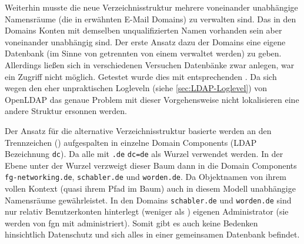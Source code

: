 \documentclass[11pt,a4paper,titlepage=firstiscover]{scrartcl} %
\begin{document}
Weiterhin musste die neue Verzeichnisstruktur   
mehrere voneinander unabhängige Namensräume (die  in 
 erwähnten E-Mail Domains) zu verwalten sind. Das 
  in den Domains Konten mit demselben 
unqualifizierten  Namen vorhanden 
sein  aber voneinander unabhängig sind. Der erste Ansatz dazu 
  der  Domains eine eigene 
Datenbank (im Sinne von getrennten  von einem  
verwaltet werden) zu geben. Allerdings ließen sich in verschiedenen Versuchen 
 Datenbänke zwar anlegen,  war 
ein Zugriff  nicht möglich. Getestet wurde dies mit 
entsprechenden . Da sich 
 wegen den eher unpraktischen Logleveln 
(siehe \autoref{sec:LDAP-Loglevel}) von OpenLDAP das genaue Problem mit dieser 
Vorgehensweise nicht lokalisieren  eine andere 
Struktur ersonnen werden.

Der Ansatz für die alternative Verzeichnisstruktur basierte 
   
werden  an den Trennzeichen () aufgespalten in einzelne Domain Components (LDAP Bezeichnung 
\texttt{dc}). Da alle  
 mit \texttt{.de}  \texttt{dc=de} als 
Wurzel  verwendet werden. In der 
 Ebene unter der Wurzel verzweigt dieser Baum dann in die 
 Domain Components \texttt{fg-networking.de}, 
\texttt{schabler.de} und \texttt{worden.de}. Da Objektnamen von ihrem vollen 
Kontext (quasi ihrem Pfad im Baum)  auch in diesem Modell 
 unabhängige Namensräume gewährleistet. In den Domains 
\texttt{schabler.de} und \texttt{worden.de} sind nur relativ 
 Benutzerkonten hinterlegt (weniger als 
)  eigenen Administrator (sie werden von 
fgn mit administriert). Somit gibt es auch keine Bedenken hinsichtlich 
Datenschutz und  sich alles in einer gemeinsamen 
Datenbank befindet.  
 
\end{document}
